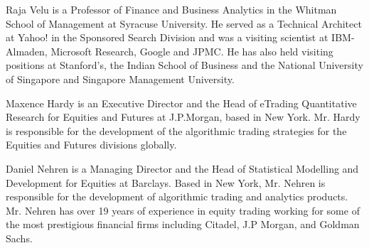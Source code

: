 \noindent Raja Velu is a Professor of Finance and Business Analytics in the Whitman School of Management at Syracuse University. He served as a Technical Architect at Yahoo! in the Sponsored Search Division and was a visiting scientist at IBM-Almaden, Microsoft Research, Google and JPMC. He has also held visiting positions at Stanford's, the Indian School of Business and the National University of Singapore and Singapore Management University. \medskip

\noindent Maxence Hardy is an Executive Director and the Head of eTrading Quantitative Research for Equities and Futures at J.P.Morgan, based in New York. Mr. Hardy is responsible for the development of the algorithmic trading strategies for the Equities and Futures divisions globally. \medskip

\noindent Daniel Nehren is a Managing Director and the Head of Statistical Modelling and Development for Equities at Barclays. Based in New York, Mr. Nehren is responsible for the development of algorithmic trading and analytics products. Mr. Nehren has over 19 years of experience in equity trading working for some of the most prestigious financial firms including Citadel, J.P Morgan, and Goldman Sachs. 